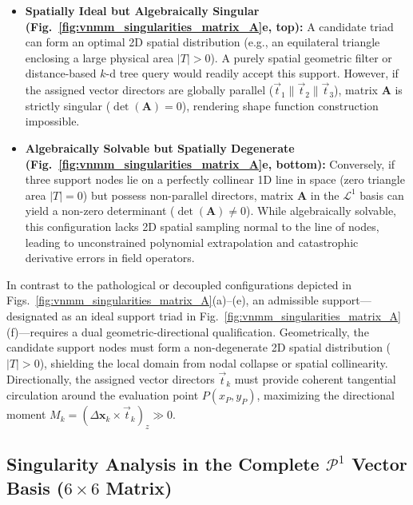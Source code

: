 \documentclass[preprint,12pt]{elsarticle}
\begin{document}
\begin{itemize}
    \item \textbf{Spatially Ideal but Algebraically Singular (Fig.~\ref{fig:vnmm_singularities_matrix_A}e, top):} A candidate triad can form an optimal 2D spatial distribution (e.g., an equilateral triangle enclosing a large physical area $|T| > 0$). A purely spatial geometric filter or distance-based $k$-d tree query would readily accept this support. However, if the assigned vector directors are globally parallel ($\vec{t}_1 \parallel \vec{t}_2 \parallel \vec{t}_3$), matrix $\mathbf{A}$ is strictly singular ($\det(\mathbf{A}) = 0$), rendering shape function construction impossible.

    \item \textbf{Algebraically Solvable but Spatially Degenerate (Fig.~\ref{fig:vnmm_singularities_matrix_A}e, bottom):} Conversely, if three support nodes lie on a perfectly collinear 1D line in space (zero triangle area $|T| = 0$) but possess non-parallel directors, matrix $\mathbf{A}$ in the $\mathcal{L}^1$ basis can yield a non-zero determinant ($\det(\mathbf{A}) \neq 0$). While algebraically solvable, this configuration lacks 2D spatial sampling normal to the line of nodes, leading to unconstrained polynomial extrapolation and catastrophic derivative errors in field operators.

\end{itemize}
In contrast to the pathological or decoupled configurations depicted in Figs.~\ref{fig:vnmm_singularities_matrix_A}(a)--(e), an admissible support---designated as an ideal support triad in Fig.~\ref{fig:vnmm_singularities_matrix_A}(f)---requires a dual geometric-directional qualification. Geometrically, the candidate support nodes must form a non-degenerate 2D spatial distribution ($|T| > 0$), shielding the local domain from nodal collapse or spatial collinearity. Directionally, the assigned vector directors $\vec{t}_k$ must provide coherent tangential circulation around the evaluation point $P(x_P, y_P)$, maximizing the directional moment $M_k = (\Delta\mathbf{x}_k \times \vec{t}_k)_z \gg 0$.

\subsection{Singularity Analysis in the Complete \texorpdfstring{$\mathcal{P}^1$}{P1} Vector Basis (\texorpdfstring{$6 \times 6$}{6x6} Matrix)}
\label{subsec:singularities_P1}
\end{document}
